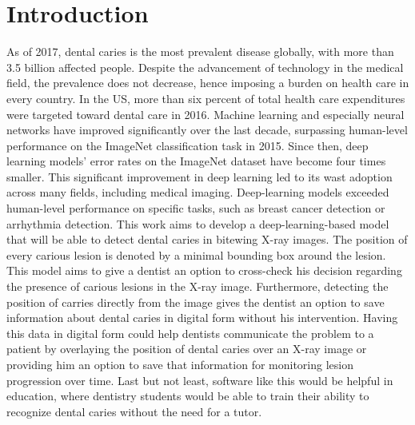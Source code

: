 \chapter{Introduction}

As of 2017, dental caries is the most prevalent disease globally,\cite{Kassebaum2015}\cite{James2018} with more than 3.5 billion affected people.  Despite the advancement of technology in the medical field, the prevalence does not decrease, hence imposing a burden on health care in every country. In the US, more than six percent of total health care expenditures were targeted toward dental care in 2016\cite{Hung2020}.
\newline
Machine learning and especially neural networks have improved significantly over the last decade, surpassing human-level performance on the ImageNet classification task in 2015\cite{He2015ICCV}. Since then, deep learning models' error rates on the ImageNet dataset have become four times smaller\cite{paperwithcode}. This significant improvement in deep learning led to its wast adoption across many fields, including medical imaging. Deep-learning models exceeded human-level performance on specific tasks, such as breast cancer detection\cite{RodriguezRuiz2019} or arrhythmia detection\cite{Hannun2019}.
\newline
This work aims to develop a deep-learning-based model that will be able to detect dental caries in bitewing X-ray images. The position of every carious lesion is denoted by a minimal bounding box around the lesion. This model aims to give a dentist an option to cross-check his decision regarding the presence of carious lesions in the X-ray image. Furthermore, detecting the position of carries directly from the image gives the dentist an option to save information about dental caries in digital form without his intervention. Having this data in digital form could help dentists communicate the problem to a patient by overlaying the position of dental caries over an X-ray image or providing him an option to save that information for monitoring lesion progression over time. Last but not least, software like this would be helpful in education, where dentistry students would be able to train their ability to recognize dental caries without the need for a tutor.
\medskip


